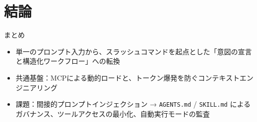 \documentclass[aspectratio=169,11pt]{beamer}
\newcommand{\cmd}[1]{\texttt{#1}}
\begin{document}
\section{結論}

\begin{frame}{まとめ}
  \begin{itemize}
    \item 単一のプロンプト入力から、スラッシュコマンドを起点とした\alert{「意図の宣言と構造化ワークフロー」}への転換
    \item 共通基盤：MCPによる動的ロードと、トークン爆発を防ぐコンテキストエンジニアリング
    \item 課題：間接的プロンプトインジェクション → \cmd{AGENTS.md} / \cmd{SKILL.md} によるガバナンス、ツールアクセスの最小化、自動実行モードの監査
  \end{itemize}
\end{frame}
\end{document}
